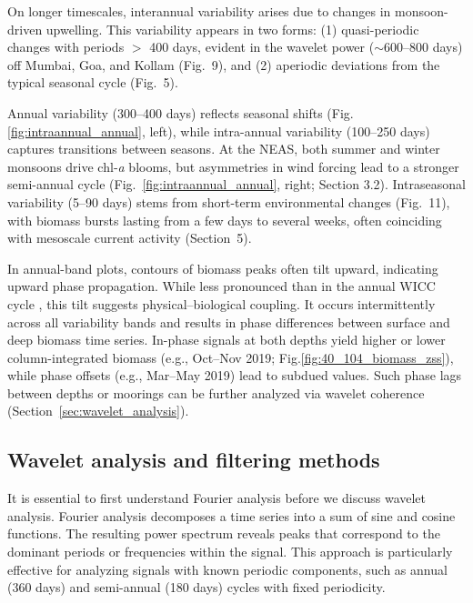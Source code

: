 \documentclass[12pt,a4paper]{article}
\providecommand{\DIFaddtex}[1]{{\protect\color{blue}\uwave{#1}}} %
\providecommand{\DIFaddbegin}{} %
\providecommand{\DIFaddend}{} %
\providecommand{\DIFadd}[1]{\texorpdfstring{\DIFaddtex{#1}}{#1}} %
\newcommand{\DIFaddincludegraphics}[2][]{{\color{blue}\fbox{\DIFOincludegraphics[#1]{#2}}}} %
\DeclareRobustCommand{\DIFaddbegin}{\DIFOaddbegin \let\includegraphics\DIFaddincludegraphics} %
\DeclareRobustCommand{\DIFaddend}{\DIFOaddend \let\includegraphics\DIFOincludegraphics} %
\begin{document}
On longer timescales, interannual variability arises due to changes in monsoon-driven upwelling. This variability appears in two forms: (1) quasi-periodic changes with periods $>$ 400 days, evident in the wavelet power ($\sim$600--800 days) off Mumbai, Goa, and Kollam (Fig.~9), and (2) aperiodic deviations from the typical seasonal cycle (Fig.~5).

Annual variability (300--400 days) reflects seasonal shifts (Fig.\ref{fig:intraannual_annual}, left), while intra-annual variability (100--250 days) captures transitions between seasons. At the NEAS, both summer and winter monsoons drive chl‑\textit{a} blooms, but asymmetries in wind forcing lead to a stronger semi-annual cycle \citep{jensen1993equatorial, schott20011} (Fig.~\ref{fig:intraannual_annual}, right; Section 3.2). Intraseasonal variability (5--90 days) stems from short-term environmental changes (Fig.~11), with biomass bursts lasting from a few days to several weeks, often coinciding with mesoscale current activity \citep{amol2014observed, chaudhuri2020observed} (Section\DIFaddbegin \DIFadd{.}\DIFaddend ~5).

In annual-band plots, contours of biomass peaks often tilt upward, indicating upward phase propagation. While less pronounced than in the annual WICC cycle \citep{amol2014observed, chaudhuri2020observed, chaudhuri2021observed}, this tilt suggests physical–biological coupling. It occurs intermittently across all variability bands and results in phase differences between surface and deep biomass time series. In-phase signals at both depths yield higher or lower column-integrated biomass (e.g., Oct--Nov 2019; Fig.\ref{fig:40_104_biomass_zss}), while phase offsets (e.g., Mar--May 2019) lead to subdued values. Such phase lags between depths or moorings can be further analyzed via wavelet coherence (Section\DIFaddbegin \DIFadd{.}\DIFaddend ~\ref{sec:wavelet_analysis}).

\subsection{Wavelet analysis and filtering methods}
\label{sec:wavelet_lanczos}
It is essential to first understand Fourier analysis before we discuss wavelet analysis. Fourier analysis decomposes a time series into a sum of sine and cosine functions. The resulting power spectrum reveals peaks that correspond to the dominant periods or frequencies within the signal. This approach is particularly effective for analyzing signals with known periodic components, such as annual (360 days) and semi-annual (180 days) cycles with fixed periodicity. 
\end{document}

